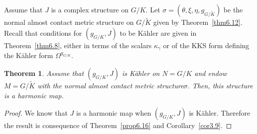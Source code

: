 \documentclass[a4paper,reqno]{amsart}
\newtheorem{thm}{Theorem}[section]
\theoremstyle{definition}
\theoremstyle{remark}
\theoremstyle{plain}
\numberwithin{equation}{section}
\newcommand{\Kt}{{\widetilde{K}}}
\newcommand{\wK}{{\widetilde{K}}}
\newcommand{\kahler}{K\"ahler\xspace}
\newcommand{\NACMS}{normal almost contact metric
  structure\xspace}
\newcommand{\txeMK}{{(\theta,\xi,\eta,g_{\scriptscriptstyle{G/\wK}})}}
\begin{document}
 Assume that $J$ is a complex
 structure on $G/K$. Let $\sigma= \txeMK$ be the \NACMS on $G/\Kt$
 given by Theorem~\ref{thm6.12}.  
Recall that  conditions for $(g_{\scriptscriptstyle{G/K}},J)$ to be \kahler are given in
Theorem~\ref{thm6.8}, either in terms of the scalars
$\kappa_\gamma$ or of the KKS form defining the \kahler form
$\Omega^{g_{\scriptscriptstyle{G/K}}}$.
 

\begin{thm}
  \label{thm6.17}
 Assume that $(g_{\scriptscriptstyle{G/K}},J)$ is \kahler on $N=G/K$ and  endow $M=G/\Kt$ with the
 \NACMS $\sigma$.
  Then, this structure is a harmonic map.
\end{thm}

\begin{proof}
  We know that $J$ is a harmonic map when $(g_{\scriptscriptstyle{G/K}},J)$ is
  \kahler. Therefore the result is consequence of
  Theorem~\ref{prop6.16} and Corollary~\ref{cor3.9}.
\end{proof}
\end{document}
